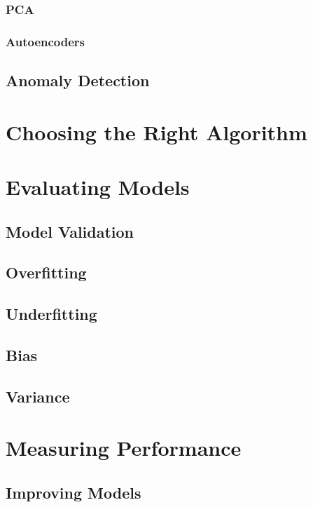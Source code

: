 \subsubsection{PCA}

\subsubsection{Autoencoders}

\subsection{Anomaly Detection}

\section{Choosing the Right Algorithm}

\section{Evaluating Models}

\subsection{Model Validation}

\subsection{Overfitting}

\subsection{Underfitting}

\subsection{Bias}

\subsection{Variance}

\section{Measuring Performance}

\subsection{Improving Models}

